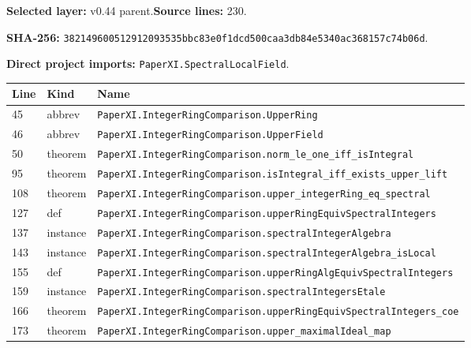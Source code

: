 \documentclass[10pt,oneside]{book}
\begin{document}
\textbf{Selected layer:} v0.44 parent.\quad\textbf{Source lines:} 230.\par\textbf{SHA-256:} {\scriptsize\nolinkurl{382149600512912093535bbc83e0f1dcd500caa3db84e5340ac368157c74b06d}}.


\textbf{Direct project imports:} \nolinkurl{PaperXI.SpectralLocalField}.

\begin{longtable}{@{}p{}p{}p{}@{}}\toprule Line&Kind&Name\\\midrule\endhead

45&abbrev&\nolinkurl{PaperXI.IntegerRingComparison.UpperRing}\\

46&abbrev&\nolinkurl{PaperXI.IntegerRingComparison.UpperField}\\

50&theorem&\nolinkurl{PaperXI.IntegerRingComparison.norm_le_one_iff_isIntegral}\\

95&theorem&\nolinkurl{PaperXI.IntegerRingComparison.isIntegral_iff_exists_upper_lift}\\

108&theorem&\nolinkurl{PaperXI.IntegerRingComparison.upper_integerRing_eq_spectral}\\

127&def&\nolinkurl{PaperXI.IntegerRingComparison.upperRingEquivSpectralIntegers}\\

137&instance&\nolinkurl{PaperXI.IntegerRingComparison.spectralIntegerAlgebra}\\

143&instance&\nolinkurl{PaperXI.IntegerRingComparison.spectralIntegerAlgebra_isLocal}\\

155&def&\nolinkurl{PaperXI.IntegerRingComparison.upperRingAlgEquivSpectralIntegers}\\

159&instance&\nolinkurl{PaperXI.IntegerRingComparison.spectralIntegersEtale}\\

166&theorem&\nolinkurl{PaperXI.IntegerRingComparison.upperRingEquivSpectralIntegers_coe}\\

173&theorem&\nolinkurl{PaperXI.IntegerRingComparison.upper_maximalIdeal_map}\\


\end{longtable}
\end{document}
